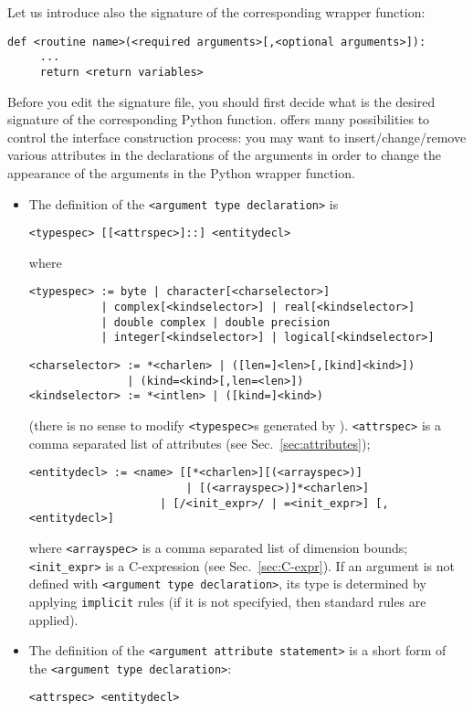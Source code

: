 Let us introduce also the signature of the corresponding wrapper
function:
\begin{verbatim}
def <routine name>(<required arguments>[,<optional arguments>]):
     ...
     return <return variables>
\end{verbatim}

Before you edit the signature file, you should first decide what is the
desired signature of the corresponding Python function. \fpy offers
many possibilities to control the interface construction process: you
may want to insert/change/remove various attributes in the
declarations of the arguments in order to change the appearance
of the arguments in the Python wrapper function.

\begin{itemize}
\item 
The definition of the \texttt{<argument type declaration>} is
\begin{verbatim}
<typespec> [[<attrspec>]::] <entitydecl>
\end{verbatim}
where
\begin{verbatim}
<typespec> := byte | character[<charselector>] 
           | complex[<kindselector>] | real[<kindselector>]
           | double complex | double precision 
           | integer[<kindselector>] | logical[<kindselector>] 
\end{verbatim}
\begin{verbatim}
<charselector> := *<charlen> | ([len=]<len>[,[kind]<kind>])
               | (kind=<kind>[,len=<len>])
<kindselector> := *<intlen> | ([kind=]<kind>)
\end{verbatim}
(there is no sense to modify \texttt{<typespec>}s generated by \fpy).
\texttt{<attrspec>} is a comma separated list of attributes (see
Sec.~\ref{sec:attributes});
\begin{verbatim}
<entitydecl> := <name> [[*<charlen>][(<arrayspec>)] 
                        | [(<arrayspec>)]*<charlen>]
                    | [/<init_expr>/ | =<init_expr>] [,<entitydecl>]
\end{verbatim}
where \texttt{<arrayspec>} is a comma separated list of dimension
bounds; \texttt{<init\_expr>} is a C-expression (see
Sec.~\ref{sec:C-expr}).  If an argument is not defined with
\texttt{<argument type declaration>}, its type is determined by
applying \texttt{implicit} rules (if it is not specifyied, then
standard rules are applied).

\item The definition of the \texttt{<argument attribute statement>} is 
a short form of the \texttt{<argument type declaration>}:
\begin{verbatim}
<attrspec> <entitydecl>
\end{verbatim}


\end{itemize}
